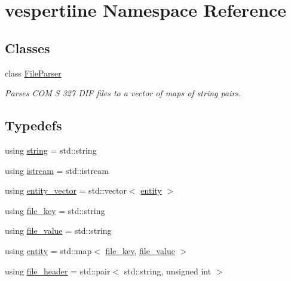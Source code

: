 \hypertarget{namespacevespertiine}{}\section{vespertiine Namespace Reference}
\label{namespacevespertiine}
\subsection*{Classes}
\begin{DoxyCompactItemize}
\item 
class \hyperlink{classvespertiine_1_1FileParser}{File\+Parser}
\begin{DoxyCompactList}\small\item\em Parses C\+OM S 327 D\+IF files to a vector of maps of string pairs. \end{DoxyCompactList}\end{DoxyCompactItemize}
\subsection*{Typedefs}
\begin{DoxyCompactItemize}
\item 
using \hyperlink{group__vespertiine_ga7e5191e67b3b71f8044b653a3f9b2065}{string} = std\+::string
\item 
using \hyperlink{group__vespertiine_ga338498d8eeb1f5a3da1f237df24c4250}{istream} = std\+::istream
\item 
using \hyperlink{group__vespertiine_ga01f4e06d9363d6dc31a69d8a0553b93d}{entity\+\_\+vector} = std\+::vector$<$ \hyperlink{group__vespertiine_gaf9205d715bdeade18d7039864ef59b44}{entity} $>$
\item 
using \hyperlink{group__vespertiine_ga39a811996b190f9e1ffa0663d4f5744a}{file\+\_\+key} = std\+::string
\item 
using \hyperlink{group__vespertiine_ga546be9d1b39ff78c5bf63e598bc51a0a}{file\+\_\+value} = std\+::string
\item 
using \hyperlink{group__vespertiine_gaf9205d715bdeade18d7039864ef59b44}{entity} = std\+::map$<$ \hyperlink{group__vespertiine_ga39a811996b190f9e1ffa0663d4f5744a}{file\+\_\+key}, \hyperlink{group__vespertiine_ga546be9d1b39ff78c5bf63e598bc51a0a}{file\+\_\+value} $>$
\item 
using \hyperlink{group__vespertiine_ga1294ff353dd9ea9b26cf4a1573db109e}{file\+\_\+header} = std\+::pair$<$ std\+::string, unsigned int $>$
\end{DoxyCompactItemize}
